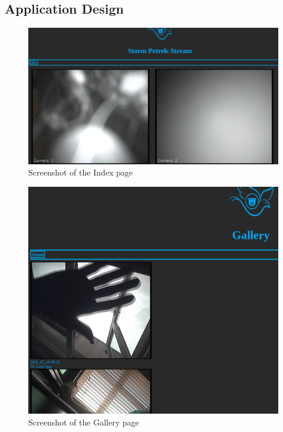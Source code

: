 \subsection{Application Design}
    \begin{figure}[!htbp] 
            \centering
             \includegraphics[scale=0.25]{img/ssStream.png}
            \caption{Screenshot of the Index page}
            \label{fig:my_label}
        \end{figure}    
    \begin{figure}[!htbp] 
                \centering
                \includegraphics[scale=0.4]{img/ssGallery.png}
                \caption{Screenshot of the Gallery page}
                \label{fig:my_label}
            \end{figure}  
